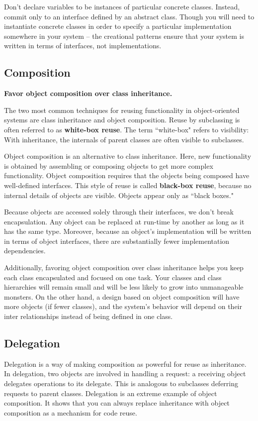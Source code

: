 \documentclass{article}
\begin{document}
Don't declare variables to be instances of particular concrete classes. Instead, commit only to an interface defined by an abstract class. Though you will need to instantiate concrete classes in order to specify a particular implementation somewhere in your system -- the creational patterns ensure that your system is written in terms of interfaces, not implementations.

\subsection{Composition}

\textbf{Favor object composition over class inheritance.}

The two most common techniques for reusing functionality in object-oriented systems are class inheritance and object composition. Reuse by subclassing is often referred to as \textbf{white-box reuse}. The term ``white-box" refers to visibility: With inheritance, the internals of parent classes are often visible to subclasses.

Object composition is an alternative to class inheritance. Here, new functionality is obtained by assembling or composing objects to get more complex functionality. Object composition requires that the objects being composed have well-defined interfaces. This style of reuse is called \textbf{black-box reuse}, because no internal details of objects are visible. Objects appear only as ``black boxes."

Because objects are accessed solely through their interfaces, we don't break encapsulation. Any object can be replaced at run-time by another as long as it has the same type. Moreover, because an object's implementation will be written in terms of object interfaces, there are substantially fewer implementation dependencies.

Additionally, favoring object composition over class inheritance helps you keep each class encapsulated and focused on one task. Your classes and class hierarchies will remain small and will be less likely to grow into unmanageable monsters. On the other hand, a design based on object composition will have more objects (if fewer classes), and the system's behavior will depend on their inter relationships instead of being defined in one class.

\subsection{Delegation}
Delegation is a way of making composition as powerful for reuse as inheritance. In delegation, two objects are involved in handling a request: a receiving object delegates operations to its delegate. This is analogous to subclasses deferring requests to parent classes. Delegation is an extreme example of object composition. It shows that you can always replace inheritance with object composition as a mechanism for code reuse.
\end{document}
